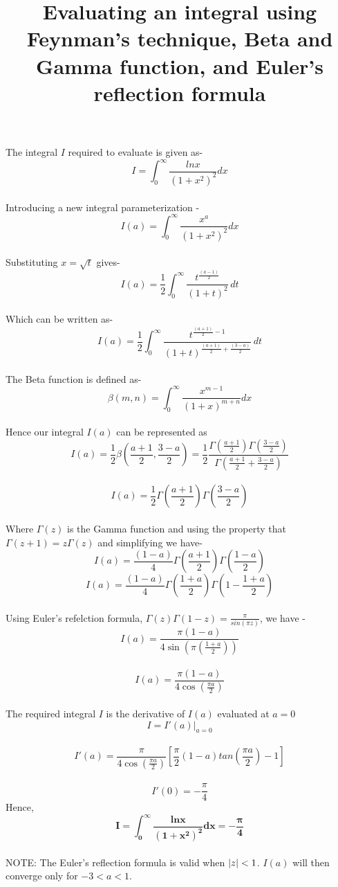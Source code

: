 \documentclass{article}
\title{Evaluating an integral using Feynman's technique, Beta and Gamma function, and Euler's reflection formula}
\begin{document}
\maketitle

\section*{}


The integral $I$ required to evaluate is given as-\\[10pt]  
$$I=\int_{0}^{\infty}\frac{lnx}{(1+x^2)^2}dx$$\\[10pt]
Introducing a new integral parameterization -\\[10pt]
$$I(a)=\int_{0}^{\infty}\frac{x^a}{(1+x^2)^2}dx$$\\[10pt]
Substituting $x=\sqrt{t}$ gives-\\[10pt]
$$I(a) =\frac{1}{2} \int_{0}^{\infty} \frac{t^{\frac{(a-1)}{2}}}{(1+t)^2} \, dt$$\\[10pt]
Which can be written as-\\[10pt]
$$I(a) =\frac{1}{2} \int_{0}^{\infty} \frac{t^{\frac{(a+1)}{2}-1}}{(1+t)^{\frac{(a+1)}{2}+\frac{(3-a)}{2}}} \, dt$$\\[10pt]
The Beta function is defined as-\\[10pt]
$$\beta\left(m,n\right)=\int_{0}^{\infty}\frac{x^{m-1}}{(1+x)^{m+n}}dx$$\\[10pt]
Hence our integral $I(a)$ can be represented as\\[10pt]
$$I(a)=\frac{1}{2}\beta\left(\frac{a+1}{2},\frac{3-a}{2}\right)=\frac{1}{2}\frac{\Gamma\left(\frac{a+1}{2}\right)\Gamma\left(\frac{3-a}{2}\right)}{\Gamma\left(\frac{a+1}{2}+\frac{3-a}{2}\right)}$$\\[10pt]
$$I(a)=\frac{1}{2}{\Gamma\left(\frac{a+1}{2}\right)\Gamma\left(\frac{3-a}{2}\right)}$$\\[10pt]
Where $\Gamma(z)$ is the Gamma function and using the property that  $\Gamma(z+1)=z\Gamma(z)$ and simplifying we have-\\[10pt]
$$ I(a)= \frac{(1-a)}{4}\Gamma\left(\frac{a+1}{2}\right)\Gamma\left(\frac{1-a}{2}\right)$$
$$ I(a)= \frac{(1-a)}{4}\Gamma\left(\frac{1+a}{2}\right)\Gamma\left({1-\frac{1+a}{2}}\right)$$\\[10pt]
Using Euler's refelction formula, $\Gamma(z)\Gamma(1-z)=\frac{\pi}{sin(\pi{z})}$, we have -\\[10pt]
$$I(a) = \frac{\pi (1-a)}{4 \sin\left(\pi \left(\frac{1+a}{2}\right)\right)}$$\\[10pt]
$$I(a) = \frac{\pi (1-a)}{4 \cos\left(\frac{\pi{a}}{2}\right)}$$\\[10pt]
The required integral $I$ is the derivative of $I(a)$ evaluated at $a=0$\\[10pt]
$$I= I'(a)\Big|_{a=0}$$\\[10pt]
$$I'(a)=\frac{\pi}{4\cos\left(\frac{\pi{a}}{2}\right)}\left[\frac{\pi}{2}\left(1-a\right){tan\left(\frac{\pi{a}}{2}\right)-1}\right]$$\\[10pt]
$$I'(0)=-\frac{\pi}{4}$$
Hence,
$$\mathbf{I=\int_{0}^{\infty}\frac{lnx}{(1+x^2)^2}dx=-\frac{\mathbf{\pi}}{4}}$$\\[50pt]
NOTE: The Euler's reflection formula is valid when $\small|z\small|<1$. $I(a)$ will then converge only for $-3<a<1$.
\end{document}

